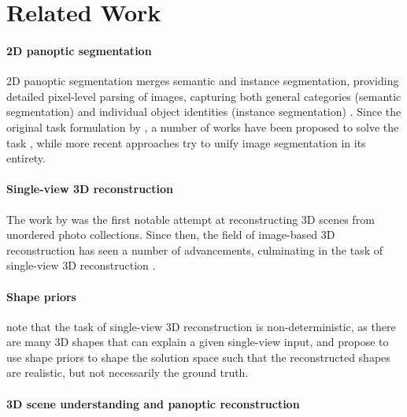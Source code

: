 \section{Related Work}
\label{sec:related}

\paragraph{2D panoptic segmentation}
2D panoptic segmentation merges semantic and instance segmentation, providing detailed pixel-level parsing of images, capturing both general categories (semantic segmentation)
and individual object identities (instance segmentation) \citep{kirillov2019panoptic}. Since the original task formulation by \citet{kirillov2019panoptic}, a number of works
have been proposed to solve the task \cite{wang2020axial, cheng2020panoptic, mohan2021efficientps, Li_2021_CVPR, Wang_2021_CVPR, Li_2022_CVPR, Kundu_2022_CVPR, Cheng_2022_CVPR, Yu_2022_CVPR, Xu_2023_CVPR, Chen_2023_ICCV, li2023mask, yu2023convolutions},
while more recent approaches \citep{Jain_2023_CVPR} try to unify image segmentation in its entirety.

\paragraph{Single-view 3D reconstruction}
The work by \citet{snavely2006photo} was the first notable attempt at reconstructing 3D scenes from unordered photo collections. Since then, the field of image-based 3D reconstruction
has seen a number of advancements, culminating in the task of single-view 3D reconstruction \citep{choy20163d, wang2018pixel2mesh, mescheder2019occupancy, huang2019perspectivenet, shin20193d, denninger20203d, nie2020total3dunderstanding}.

\paragraph{Shape priors}
\citet{wu2018learning} note that the task of single-view 3D reconstruction is non-deterministic, as there are many 3D shapes that can explain a given single-view input, and propose
to use shape priors to shape the solution space such that the reconstructed shapes are realistic, but not necessarily the ground truth.

\paragraph{3D scene understanding and panoptic reconstruction}

